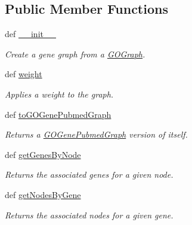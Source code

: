 \subsection*{Public Member Functions}
\begin{DoxyCompactItemize}
\item 
def \hyperlink{class_g_o_gene_graph_1_1_g_o_gene_graph_a37f579f2fd7c2e8f0e52345e5c94233f}{\_\-\_\-init\_\-\_\-}
\begin{DoxyCompactList}\small\item\em Create a gene graph from a \hyperlink{namespace_g_o_graph}{GOGraph}. \item\end{DoxyCompactList}\item 
def \hyperlink{class_g_o_gene_graph_1_1_g_o_gene_graph_a276c7e223374b8c22417e195afacffed}{weight}
\begin{DoxyCompactList}\small\item\em Applies a weight to the graph. \item\end{DoxyCompactList}\item 
def \hyperlink{class_g_o_gene_graph_1_1_g_o_gene_graph_a5f437c2ab06eacde21831786192c4a4e}{toGOGenePubmedGraph}
\begin{DoxyCompactList}\small\item\em Returns a \hyperlink{namespace_g_o_gene_pubmed_graph}{GOGenePubmedGraph} version of itself. \item\end{DoxyCompactList}\item 
def \hyperlink{class_g_o_gene_graph_1_1_g_o_gene_graph_a778128e77640d18bcaf775c2348013d4}{getGenesByNode}
\begin{DoxyCompactList}\small\item\em Returns the associated genes for a given node. \item\end{DoxyCompactList}\item 
def \hyperlink{class_g_o_gene_graph_1_1_g_o_gene_graph_a353497bb1605cfbefba350861e81ea6e}{getNodesByGene}
\begin{DoxyCompactList}\small\item\em Returns the associated nodes for a given gene. \item\end{DoxyCompactList}\end{DoxyCompactItemize}



